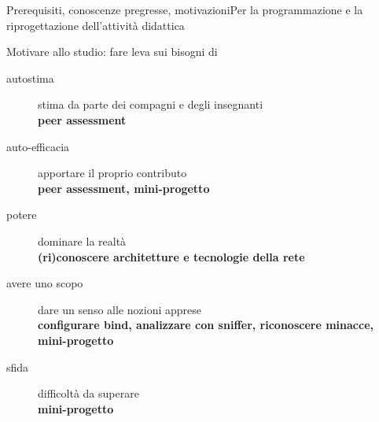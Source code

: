 \documentclass[italian]{beamer}
\begin{document}
\begin{frame}[allowframebreaks]{Prerequisiti, conoscenze pregresse, motivazioni}{Per la programmazione e la riprogettazione dell'attivit\`a didattica}
		
	\begin{block}{Motivare allo studio: fare leva sui bisogni di}
		\begin{description}
			\item[autostima] stima da parte dei compagni e degli insegnanti\\\hfill\textbf{peer assessment}
			\item[auto-efficacia] apportare il proprio contributo\\\hfill\textbf{peer assessment, mini-progetto}
			\item[potere] dominare la realt\`a\\\hfill\textbf{(ri)conoscere architetture e tecnologie della rete}
			\item[avere uno scopo] dare un senso alle nozioni apprese\\\hfill\textbf{configurare bind, analizzare con sniffer, riconoscere minacce, mini-progetto}
			\item[sfida] difficolt\`a da superare\\\hfill\textbf{mini-progetto}
		\end{description}
	\end{block}
\end{frame}
\end{document}
